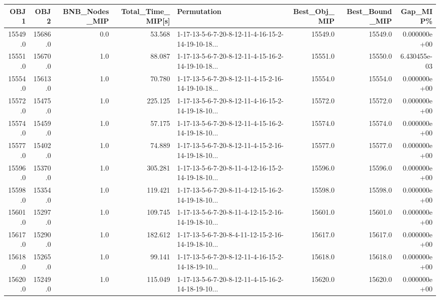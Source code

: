 \begin{tabular}{rrrrlrrr}
\toprule
    OBJ1 &     OBJ2 &  BNB\_Nodes\_MIP &  Total\_Time\_MIP[s] &                                        Permutation &  Best\_Obj\_MIP &  Best\_Bound\_MIP &      Gap\_MIP\% \\
\midrule
 15549.0 &  15686.0 &            0.0 &             53.568 &  1-17-13-5-6-7-20-8-12-11-4-16-15-2-14-19-10-18... &       15549.0 &         15549.0 &  0.000000e+00 \\
 15551.0 &  15670.0 &            1.0 &             88.087 &  1-17-13-5-6-7-20-8-12-11-4-15-16-2-14-19-10-18... &       15551.0 &         15550.0 &  6.430455e-03 \\
 15554.0 &  15613.0 &            1.0 &             70.780 &  1-17-13-5-6-7-20-8-12-11-4-15-2-16-14-19-10-18... &       15554.0 &         15554.0 &  0.000000e+00 \\
 15572.0 &  15475.0 &            1.0 &            225.125 &  1-17-13-5-6-7-20-8-12-11-4-16-15-2-14-19-18-10... &       15572.0 &         15572.0 &  0.000000e+00 \\
 15574.0 &  15459.0 &            1.0 &             57.175 &  1-17-13-5-6-7-20-8-12-11-4-15-16-2-14-19-18-10... &       15574.0 &         15574.0 &  0.000000e+00 \\
 15577.0 &  15402.0 &            1.0 &             74.889 &  1-17-13-5-6-7-20-8-12-11-4-15-2-16-14-19-18-10... &       15577.0 &         15577.0 &  0.000000e+00 \\
 15596.0 &  15370.0 &            1.0 &            305.281 &  1-17-13-5-6-7-20-8-11-4-12-16-15-2-14-19-18-10... &       15596.0 &         15596.0 &  0.000000e+00 \\
 15598.0 &  15354.0 &            1.0 &            119.421 &  1-17-13-5-6-7-20-8-11-4-12-15-16-2-14-19-18-10... &       15598.0 &         15598.0 &  0.000000e+00 \\
 15601.0 &  15297.0 &            1.0 &            109.745 &  1-17-13-5-6-7-20-8-11-4-12-15-2-16-14-19-18-10... &       15601.0 &         15601.0 &  0.000000e+00 \\
 15617.0 &  15290.0 &            1.0 &            182.612 &  1-17-13-5-6-7-20-8-4-11-12-15-2-16-14-19-18-10... &       15617.0 &         15617.0 &  0.000000e+00 \\
 15618.0 &  15265.0 &            1.0 &             99.141 &  1-17-13-5-6-7-20-8-12-11-4-16-15-2-14-18-19-10... &       15618.0 &         15618.0 &  0.000000e+00 \\
 15620.0 &  15249.0 &            1.0 &            115.049 &  1-17-13-5-6-7-20-8-12-11-4-15-16-2-14-18-19-10... &       15620.0 &         15620.0 &  0.000000e+00 \\

\end{tabular}
